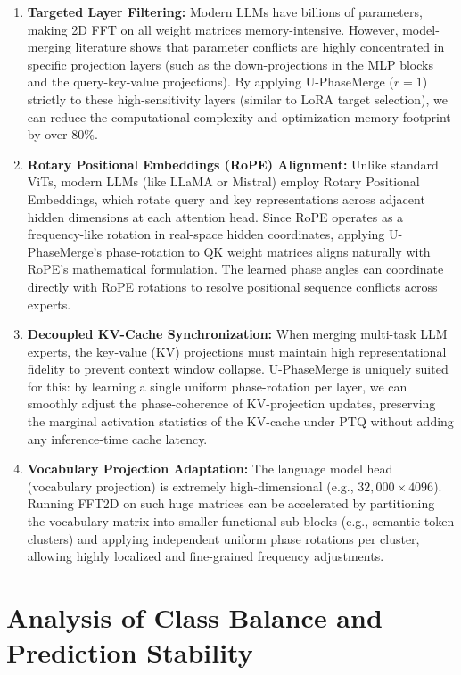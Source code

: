 \documentclass{article}
\theoremstyle{plain}
\theoremstyle{definition}
\theoremstyle{remark}
\begin{document}
\begin{enumerate}
    \item \textbf{Targeted Layer Filtering:} Modern LLMs have billions of parameters, making 2D FFT on all weight matrices memory-intensive. However, model-merging literature shows that parameter conflicts are highly concentrated in specific projection layers (such as the down-projections in the MLP blocks and the query-key-value projections). By applying U-PhaseMerge ($r=1$) strictly to these high-sensitivity layers (similar to LoRA target selection), we can reduce the computational complexity and optimization memory footprint by over $80\%$.
    \item \textbf{Rotary Positional Embeddings (RoPE) Alignment:} Unlike standard ViTs, modern LLMs (like LLaMA or Mistral) employ Rotary Positional Embeddings, which rotate query and key representations across adjacent hidden dimensions at each attention head. Since RoPE operates as a frequency-like rotation in real-space hidden coordinates, applying U-PhaseMerge's phase-rotation to QK weight matrices aligns naturally with RoPE's mathematical formulation. The learned phase angles can coordinate directly with RoPE rotations to resolve positional sequence conflicts across experts.
    \item \textbf{Decoupled KV-Cache Synchronization:} When merging multi-task LLM experts, the key-value (KV) projections must maintain high representational fidelity to prevent context window collapse. U-PhaseMerge is uniquely suited for this: by learning a single uniform phase-rotation per layer, we can smoothly adjust the phase-coherence of KV-projection updates, preserving the marginal activation statistics of the KV-cache under PTQ without adding any inference-time cache latency.
    \item \textbf{Vocabulary Projection Adaptation:} The language model head (vocabulary projection) is extremely high-dimensional (e.g., $32,000 \times 4096$). Running FFT2D on such huge matrices can be accelerated by partitioning the vocabulary matrix into smaller functional sub-blocks (e.g., semantic token clusters) and applying independent uniform phase rotations per cluster, allowing highly localized and fine-grained frequency adjustments.
\end{enumerate}

\section{Analysis of Class Balance and Prediction Stability}
\label{sec:app_stability}
\end{document}
